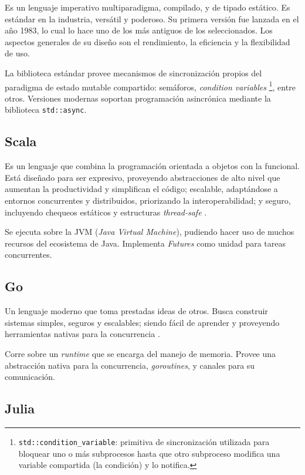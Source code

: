 \documentclass[11pt]{article}
\let\Oldsubsection\subsection
\renewcommand{\subsection}{\FloatBarrier\Oldsubsection}
\newcommand{\english}[1]{\textit{#1}}
\newcommand{\technical}[1]{\textit{#1}}
\begin{document}
Es un lenguaje imperativo multiparadigma, compilado, y de tipado estático. Es estándar en la industria, versátil y poderoso. Su primera versión fue lanzada en el año 1983, lo cual lo hace uno de los más antiguos de los seleccionados. Los aspectos generales de su diseño son el rendimiento, la eficiencia y la flexibilidad de uso.

La biblioteca estándar provee mecanismos de sincronización propios del paradigma de estado mutable compartido: semáforos, \english{condition variables} \footnote{\lstinline{std::condition_variable}: primitiva de sincronización utilizada para bloquear uno o más subprocesos hasta que otro subproceso modifica una variable compartida (la condición) y lo notifica.}, entre otros. Versiones modernas soportan programación asincrónica mediante la biblioteca \lstinline{std::async}.

\subsection{Scala}

Es un lenguaje que combina la programación orientada a objetos con la funcional. Está diseñado para ser expresivo, proveyendo abstracciones de alto nivel que aumentan la productividad y simplifican el código; escalable, adaptándose a entornos concurrentes y distribuidos, priorizando la interoperabilidad; y seguro, incluyendo chequeos estáticos y estructuras \english{thread-safe} \cite{com:scala}.

Se ejecuta sobre la JVM (\technical{Java Virtual Machine}), pudiendo hacer uso de muchos recursos del ecosistema de Java. Implementa \english{Futures} como unidad para tareas concurrentes.

\subsection{Go}

Un lenguaje moderno que toma prestadas ideas de otros. Busca construir sistemas simples, seguros y escalables; siendo fácil de aprender y proveyendo herramientas nativas para la concurrencia \cite{com:go}.

Corre sobre un \english{runtime} que se encarga del manejo de memoria. Provee una abstracción nativa para la concurrencia, \technical{goroutines}, y canales para su comunicación.

\subsection{Julia}
\end{document}
